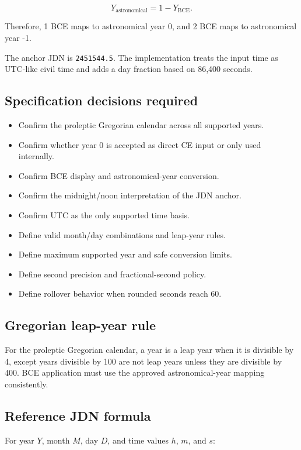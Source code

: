 \documentclass[11pt,letterpaper]{article}
\begin{document}
\[
Y_{\mathrm{astronomical}} = 1 - Y_{\mathrm{BCE}}.
\]

Therefore, 1 BCE maps to astronomical year 0, and 2 BCE maps to astronomical
year -1.

The anchor JDN is \texttt{2451544.5}. The implementation treats the input time
as UTC-like civil time and adds a day fraction based on 86,400 seconds.

\subsection{Specification decisions required}

\begin{itemize}
    \item Confirm the proleptic Gregorian calendar across all supported years.
    \item Confirm whether year 0 is accepted as direct CE input or only used internally.
    \item Confirm BCE display and astronomical-year conversion.
    \item Confirm the midnight/noon interpretation of the JDN anchor.
    \item Confirm UTC as the only supported time basis.
    \item Define valid month/day combinations and leap-year rules.
    \item Define maximum supported year and safe conversion limits.
    \item Define second precision and fractional-second policy.
    \item Define rollover behavior when rounded seconds reach 60.
\end{itemize}

\subsection{Gregorian leap-year rule}

For the proleptic Gregorian calendar, a year is a leap year when it is
divisible by 4, except years divisible by 100 are not leap years unless they
are divisible by 400. BCE application must use the approved astronomical-year
mapping consistently.

\subsection{Reference JDN formula}

For year $Y$, month $M$, day $D$, and time values $h$, $m$, and $s$:
\end{document}
